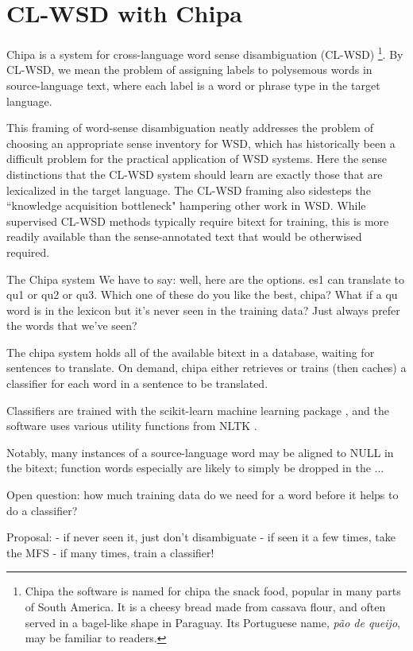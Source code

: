 \documentclass[10pt, a4paper]{article}
\begin{document}
\section{CL-WSD with Chipa}
Chipa is a system for cross-language word sense disambiguation (CL-WSD)
\footnote{Chipa the software is named for chipa the snack food, popular in many
parts of South America. It is a cheesy bread made from cassava flour, and
often served in a bagel-like shape in Paraguay. Its Portuguese name,
\emph{p\~{a}o de queijo}, may be familiar to readers.}. By
CL-WSD, we mean the problem of assigning labels to polysemous words in
source-language text, where each label is a word or phrase type in the target
language.

This framing of word-sense disambiguation neatly addresses the problem of
choosing an appropriate sense inventory for WSD, which has historically been a
difficult problem for the practical application of WSD systems.
Here the sense distinctions that the CL-WSD system should learn are exactly
those that are lexicalized in the target language.
The CL-WSD framing also sidesteps the ``knowledge
acquisition bottleneck" \cite{agirre2006word}
hampering other work in WSD. While supervised CL-WSD methods typically require
bitext for training, this is more readily available than the sense-annotated
text that would be otherwised required.

The Chipa system 
We have to say: well, here are the options. es1 can translate to qu1 or qu2 or
qu3. Which one of these do you like the best, chipa?
What if a qu word is in the lexicon but it's never seen in the training data?
Just always prefer the words that we've seen?

The chipa system holds all of the available bitext in a database, waiting for
sentences to translate.
On demand, chipa either retrieves or trains (then caches) a classifier
for each word in a sentence to be translated.

Classifiers are trained with the scikit-learn machine learning package
\cite{scikit-learn}, and the software uses various utility functions from NLTK
\cite{nltkbook}.


Notably, many instances of a source-language word may be aligned to NULL in the
bitext; function words especially are likely to simply be dropped in the ...




Open question: how much training data do we need for a word before it helps to
do a classifier?

Proposal:
- if never seen it, just don't disambiguate
- if seen it a few times, take the MFS
- if many times, train a classifier!
\end{document}
